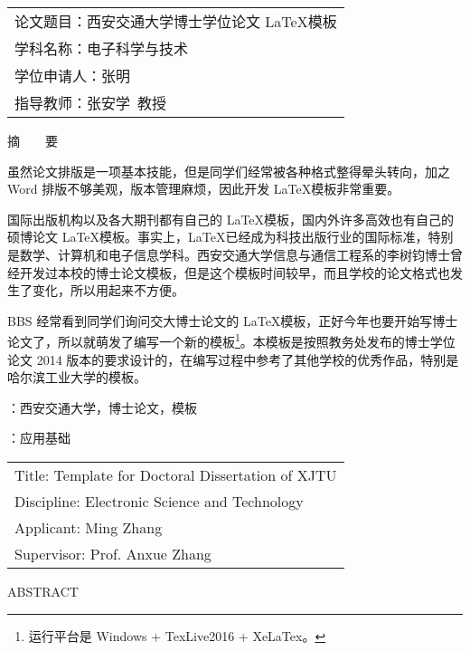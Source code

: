 
\setcounter{page}{1}

\begin{table}[!ht]\xiaosi\hei\vskip-1.5mm
	\begin{tabular}{@{}l}
		论文题目：西安交通大学博士学位论文 \LaTeX 模板 \\
		学科名称：电子科学与技术 \\
		学位申请人：张明 \\
		指导教师：张安学~教授
	\end{tabular}
\end{table}
\noindent\parbox[c][15mm][c]{\textwidth}{
	\centering\sanhao 摘~~~~要
}

虽然论文排版是一项基本技能，但是同学们经常被各种格式整得晕头转向，加之 Word 排版不够美观，版本管理麻烦，因此开发 \LaTeX 模板非常重要。

国际出版机构以及各大期刊都有自己的 \LaTeX 模板，国内外许多高效也有自己的硕博论文 \LaTeX 模板。事实上，\LaTeX 已经成为科技出版行业的国际标准，特别是数学、计算机和电子信息学科。西安交通大学信息与通信工程系的李树钧博士曾经开发过本校的博士论文模板，但是这个模板时间较早，而且学校的论文格式也发生了变化，所以用起来不方便。

BBS 经常看到同学们询问交大博士论文的 \LaTeX 模板，正好今年也要开始写博士论文了，所以就萌发了编写一个新的模板\footnote{运行平台是 \color{red}Windows + TexLive2016 + XeLaTex。}。本模板是按照教务处发布的博士学位论文 2014 版本的要求设计的，在编写过程中参考了其他学校的优秀作品，特别是哈尔滨工业大学的模板。

\vspace{\baselineskip}
{ \hangindent=50.7pt
	：西安交通大学，博士论文，模板
	
	\vspace{\baselineskip}
	：应用基础
}
\clearpage


\begin{table}[!ht]\fontsize{11.5pt}{11.5pt}\selectfont\bfseries\vskip-3mm
	\begin{tabular}{@{}l}
		Title: Template for Doctoral Dissertation of XJTU \\
		Discipline: Electronic Science and Technology \\
		Applicant: Ming Zhang \\
		Supervisor: Prof. Anxue Zhang
	\end{tabular}
\end{table}
\noindent\parbox[c][15mm][c]{\textwidth}{
	\centering\sanhao ABSTRACT
}

